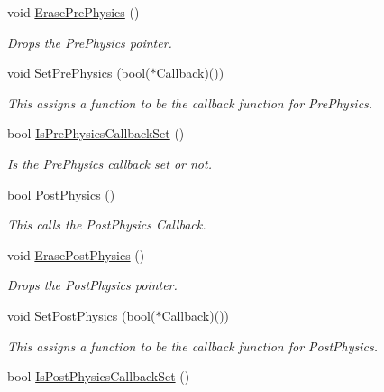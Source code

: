\begin{DoxyCompactItemize}
void \hyperlink{classphys_1_1CallBackManager_afaeba4d6ae245d1560b76799417cce40}{ErasePrePhysics} ()
\begin{DoxyCompactList}\small\item\em Drops the PrePhysics pointer. \item\end{DoxyCompactList}\item 
void \hyperlink{classphys_1_1CallBackManager_a3f06ccacd416b3109f20c30cd30f9efe}{SetPrePhysics} (bool($\ast$Callback)())
\begin{DoxyCompactList}\small\item\em This assigns a function to be the callback function for PrePhysics. \item\end{DoxyCompactList}\item 
bool \hyperlink{classphys_1_1CallBackManager_af93b7b96e85faa77ed005840e0189ebd}{IsPrePhysicsCallbackSet} ()
\begin{DoxyCompactList}\small\item\em Is the PrePhysics callback set or not. \item\end{DoxyCompactList}\item 
bool \hyperlink{classphys_1_1CallBackManager_a06bf0e8787f21caf31bf428727155084}{PostPhysics} ()
\begin{DoxyCompactList}\small\item\em This calls the PostPhysics Callback. \item\end{DoxyCompactList}\item 
void \hyperlink{classphys_1_1CallBackManager_a2d03573a93606e9d3fcd7adad5c8c397}{ErasePostPhysics} ()
\begin{DoxyCompactList}\small\item\em Drops the PostPhysics pointer. \item\end{DoxyCompactList}\item 
void \hyperlink{classphys_1_1CallBackManager_a17687cd04807dfc80a25847be830c2f2}{SetPostPhysics} (bool($\ast$Callback)())
\begin{DoxyCompactList}\small\item\em This assigns a function to be the callback function for PostPhysics. \item\end{DoxyCompactList}\item 
bool \hyperlink{classphys_1_1CallBackManager_ac4bf07f907b8d4d7e052126bcfbba4ba}{IsPostPhysicsCallbackSet} ()

\end{DoxyCompactItemize}

